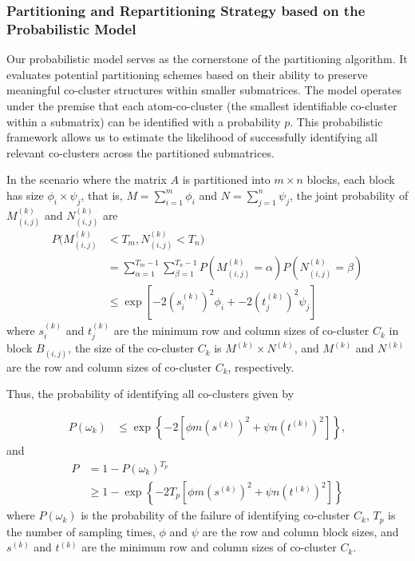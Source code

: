 \subsubsection{Partitioning and Repartitioning Strategy based on the Probabilistic Model}
Our probabilistic model serves as the cornerstone of the partitioning algorithm. It evaluates potential partitioning schemes based on their ability to preserve meaningful co-cluster structures within smaller submatrices. The model operates under the premise that each atom-co-cluster (the smallest identifiable co-cluster within a submatrix) can be identified with a probability $p$. This probabilistic framework allows us to estimate the likelihood of successfully identifying all relevant co-clusters across the partitioned submatrices.

In the scenario where the matrix $A$ is partitioned into $m \times n$ blocks, each block has size $\phi_i \times \psi_j$, that is, $M=\sum_{i=1}^m \phi_i$ and $N=\sum_{j=1}^n \psi_j$, the joint probability of $M_{(i,j)}^{(k)}$ and $N_{(i,j)}^{(k)}$ are
\begin{align*}
    P(M_{(i,j)}^{(k)} & < T_m, N_{(i,j)}^{(k)} < T_n)                               \\ & = \sum_{\alpha=1}^{T_m-1} \sum_{\beta=1}^{T_n-1} P(M_{(i,j)}^{(k)} = \alpha) P(N_{(i,j)}^{(k)} = \beta) \\
                      & \le \exp[-2 (s_i^{(k)})^2 \phi_i + -2 (t_j^{(k)})^2 \psi_j]
\end{align*}
where $s_i^{(k)}$ and $t_j^{(k)}$ are the minimum row and column sizes of co-cluster $C_k$ in block $B_{(i,j)}$, the size of the co-cluster $C_k$ is $M^{(k)} \times N^{(k)}$, and $M^{(k)}$ and $N^{(k)}$ are the row and column sizes of co-cluster $C_k$, respectively. 


Thus, the probability of identifying all co-clusters given by

\begin{align}
    P(\omega_k) & \le \exp \left\{ -2 [\phi m (s^{(k)})^2 + \psi n (t^{(k)})^2] \right\},
\end{align}
and
\begin{align}
    P & = 1 - P(\omega_k)^{T_p}                                                                                                       \\
      & \ge 1 - \exp \left\{ -2 T_p [\phi m (s^{(k)})^2 + \psi n (t^{(k)})^2] \right\} \label{eq:prob_of_identifying_all_co_clusters}
\end{align}
where $P(\omega_k)$ is the probability of the failure of identifying co-cluster $C_k$, $T_p$ is the number of sampling times, $\phi$ and $\psi$ are the row and column block sizes, and $s^{(k)}$ and $t^{(k)}$ are the minimum row and column sizes of co-cluster $C_k$.


